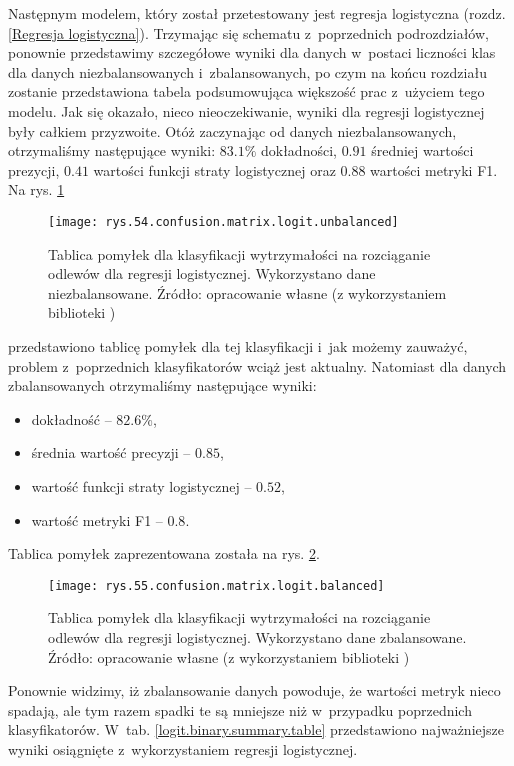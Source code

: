 Następnym modelem, który został przetestowany jest regresja logistyczna (rozdz. \ref{Regresja logistyczna}). Trzymając się schematu z~poprzednich podrozdziałów, ponownie przedstawimy szczegółowe wyniki dla danych w~postaci liczności klas dla danych niezbalansowanych i~zbalansowanych, po czym na końcu rozdziału zostanie przedstawiona tabela podsumowująca większość prac z~użyciem tego modelu. 
Jak się okazało, nieco nieoczekiwanie, wyniki dla regresji logistycznej były całkiem przyzwoite. Otóż zaczynając od danych niezbalansowanych, otrzymaliśmy następujące wyniki: $83.1\%$ dokładności, $0.91$ średniej wartości prezycji, $0.41$ wartości funkcji straty logistycznej oraz $0.88$ wartości metryki F1. Na rys. \ref{rys.54.confusion.matrix.logit.unbalanced} 
\begin{figure}[!h]
    \centering
    \texttt{[image: rys.54.confusion.matrix.logit.unbalanced]}
    \caption{Tablica pomyłek dla klasyfikacji wytrzymałości na rozciąganie odlewów dla regresji logistycznej. Wykorzystano dane niezbalansowane. Źródło: opracowanie własne (z wykorzystaniem biblioteki )}
    \label{rys.54.confusion.matrix.logit.unbalanced}
\end{figure}
przedstawiono tablicę pomyłek dla tej klasyfikacji i~jak możemy zauważyć, problem z~poprzednich klasyfikatorów wciąż jest aktualny.
Natomiast dla danych zbalansowanych otrzymaliśmy następujące wyniki:
\begin{itemize}
	\item dokładność – $82.6\%$,
	\item średnia wartość precyzji – $0.85$,
	\item wartość funkcji straty logistycznej – $0.52$,
	\item wartość metryki F1 – $0.8$.
\end{itemize}
Tablica pomyłek zaprezentowana została na rys. \ref{rys.55.confusion.matrix.logit.balanced}. 
\begin{figure}[!h]
    \centering
    \texttt{[image: rys.55.confusion.matrix.logit.balanced]}
    \caption{Tablica pomyłek dla klasyfikacji wytrzymałości na rozciąganie odlewów dla regresji logistycznej. Wykorzystano dane zbalansowane. Źródło: opracowanie własne (z wykorzystaniem biblioteki )}
    \label{rys.55.confusion.matrix.logit.balanced}
\end{figure}
Ponownie widzimy, iż zbalansowanie danych powoduje, że wartości metryk nieco spadają, ale tym razem spadki te są mniejsze niż w~przypadku poprzednich klasyfikatorów. W~tab. \ref{logit.binary.summary.table} przedstawiono najważniejsze wyniki osiągnięte z~wykorzystaniem regresji logistycznej.

